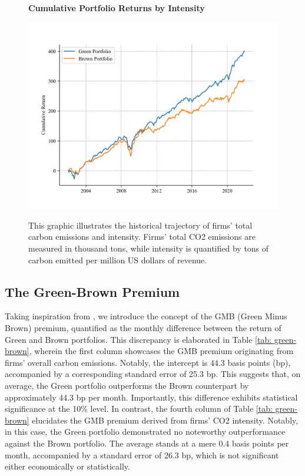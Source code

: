 \documentclass[12pt]{article}
\begin{document}
\begin{figure}[!ht]
\centering
\caption{\textbf{Cumulative Portfolio Returns by Intensity}}
\includegraphics{graphics/green_brown_int.png}
\label{fig: cum_ret_2}
\caption*{\footnotesize{This graphic illustrates the historical trajectory of firms' total carbon emissions and intensity. Firms' total CO2 emissions are measured in thousand tons, while intensity is quantified by tons of carbon emitted per million US dollars of revenue.}}
\end{figure}

\subsection{The Green-Brown Premium}

Taking inspiration from \cite{pastor2022dissecting}, we introduce the concept of the GMB (Green Minus Brown) premium, quantified as the monthly difference between the return of Green and Brown portfolios. This discrepancy is elaborated in Table \ref{tab: green-brown}, wherein the first column showcases the GMB premium originating from firms' overall carbon emissions. Notably, the intercept is 44.3 basis points (bp), accompanied by a corresponding standard error of 25.3 bp. This suggests that, on average, the Green portfolio outperforms the Brown counterpart by approximately 44.3 bp per month. Importantly, this difference exhibits statistical significance at the 10\% level. In contrast, the fourth column of Table \ref{tab: green-brown} elucidates the GMB premium derived from firms' CO2 intensity. Notably, in this case, the Green portfolio demonstrated no noteworthy outperformance against the Brown portfolio. The average stands at a mere 0.4 basis points per month, accompanied by a standard error of 26.3 bp, which is not significant either economically or statistically.
\end{document}
